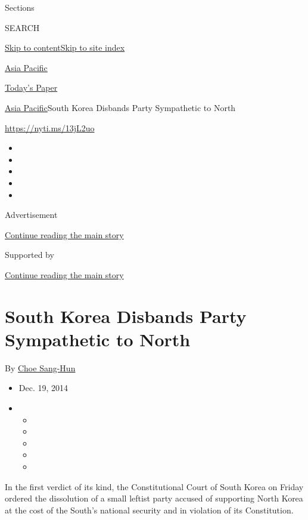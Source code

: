 Sections

SEARCH

\protect\hyperlink{site-content}{Skip to
content}\protect\hyperlink{site-index}{Skip to site index}

\href{https://www.nytimes.com/section/world/asia}{Asia Pacific}

\href{https://myaccount.nytimes.com/auth/login?response_type=cookie\&client_id=vi}{}

\href{https://www.nytimes.com/section/todayspaper}{Today's Paper}

\href{/section/world/asia}{Asia Pacific}\textbar{}South Korea Disbands
Party Sympathetic to North

\url{https://nyti.ms/13jL2uo}

\begin{itemize}
\item
\item
\item
\item
\item
\end{itemize}

Advertisement

\protect\hyperlink{after-top}{Continue reading the main story}

Supported by

\protect\hyperlink{after-sponsor}{Continue reading the main story}

\hypertarget{south-korea-disbands-party-sympathetic-to-north}{%
\section{South Korea Disbands Party Sympathetic to
North}\label{south-korea-disbands-party-sympathetic-to-north}}

By \href{http://www.nytimes.com/by/choe-sang-hun}{Choe Sang-Hun}

\begin{itemize}
\item
  Dec. 19, 2014
\item
  \begin{itemize}
  \item
  \item
  \item
  \item
  \item
  \end{itemize}
\end{itemize}

In the first verdict of its kind, the Constitutional Court of South
Korea on Friday ordered the dissolution of a small leftist party accused
of supporting North Korea at the cost of the South's national security
and in violation of its Constitution.

